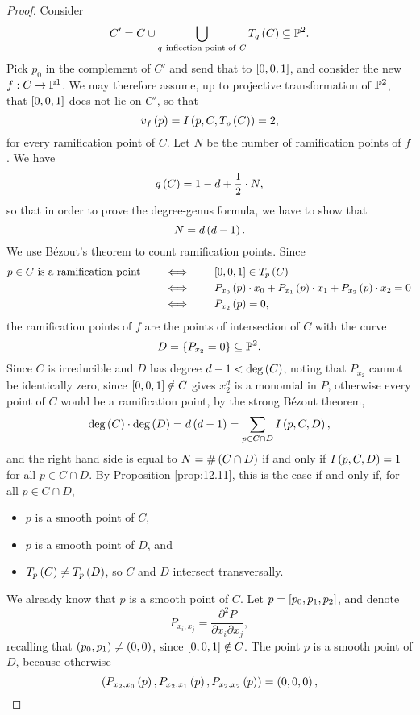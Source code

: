 \begin{proof}
Consider
$$ C' = C \cup \bigcup_{q \ \text{inflection point of} \ C} T_q\rb{C} \subseteq \P^2. $$
Pick $ p_0 $ in the complement of $ C' $ and send that to $ \sb{0, 0, 1} $, and consider the new $ f : C \to \P^1 $. We may therefore assume, up to projective transformation of $ \P^2 $, that $ \sb{0, 0, 1} $ does not lie on $ C' $, so that
$$ v_f\rb{p} = I\rb{p, C, T_p\rb{C}} = 2, $$
for every ramification point of $ C $. Let $ N $ be the number of ramification points of $ f $. We have
$$ g\rb{C} = 1 - d + \dfrac{1}{2} \cdot N, $$
so that in order to prove the degree-genus formula, we have to show that
$$ N = d\rb{d - 1}. $$
We use B\'ezout's theorem to count ramification points. Since
\begin{align*}
p \in C \ \text{is a ramification point} \qquad
& \iff \qquad \sb{0, 0, 1} \in T_p\rb{C} \\
& \iff \qquad P_{x_0}\rb{p} \cdot x_0 + P_{x_1}\rb{p} \cdot x_1 + P_{x_2}\rb{p} \cdot x_2 = 0 \\
& \iff \qquad P_{x_2}\rb{p} = 0,
\end{align*}
the ramification points of $ f $ are the points of intersection of $ C $ with the curve
$$ D = \cb{P_{x_2} = 0} \subseteq \P^2. $$
Since $ C $ is irreducible and $ D $ has degree $ d - 1 < \deg\rb{C} $, noting that $ P_{x_2} $ cannot be identically zero, since $ \sb{0, 0, 1} \notin C $ gives $ x_2^d $ is a monomial in $ P $, otherwise every point of $ C $ would be a ramification point, by the strong B\'ezout theorem,
$$ \deg\rb{C} \cdot \deg\rb{D} = d\rb{d - 1} = \sum_{p \in C \cap D} I\rb{p, C, D}, $$
and the right hand side is equal to $ N = \#\rb{C \cap D} $ if and only if $ I\rb{p, C, D} = 1 $ for all $ p \in C \cap D $. By Proposition \ref{prop:12.11}, this is the case if and only if, for all $ p \in C \cap D $,
\begin{itemize}
\item $ p $ is a smooth point of $ C $,
\item $ p $ is a smooth point of $ D $, and
\item $ T_p\rb{C} \ne T_p\rb{D} $, so $ C $ and $ D $ intersect transversally.
\end{itemize}
We already know that $ p $ is a smooth point of $ C $. Let $ p = \sb{p_0, p_1, p_2} $, and denote
$$ P_{x_i, x_j} = \dfrac{\partial^2 P}{\partial x_i\partial x_j}, $$
recalling that $ \rb{p_0, p_1} \ne \rb{0, 0} $, since $ \sb{0, 0, 1} \notin C $. The point $ p $ is a smooth point of $ D $, because otherwise
$$ \rb{P_{x_2, x_0}\rb{p}, P_{x_2, x_1}\rb{p}, P_{x_2, x_2}\rb{p}} = \rb{0, 0, 0}, $$

\end{proof}
